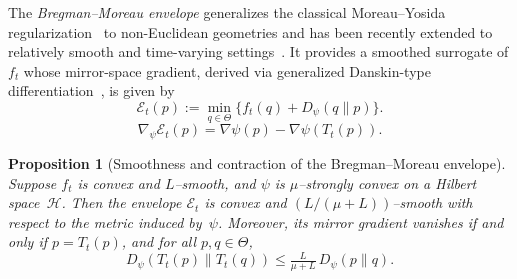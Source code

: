 \documentclass[11pt]{article}
\newcommand{\Ecal}{\mathcal{E}}
\theoremstyle{plain}
\newtheorem{proposition}[theorem]{Proposition}
\theoremstyle{definition}
\theoremstyle{remark}
\begin{document}

The \emph{Bregman--Moreau envelope} generalizes the classical
Moreau--Yosida regularization~\cite{Rockafellar1970}
to non-Euclidean geometries and has been recently extended to
relatively smooth and time-varying settings~\cite{Lu2021,Li2022,Hsieh2023}.
It provides a smoothed surrogate of $f_t$ whose mirror-space gradient,
derived via generalized Danskin-type differentiation~\cite{Zhang2020,Bauschke2019},
is given by
\begin{equation}
\Ecal_t(p):=\min_{q\in\Theta}\{f_t(q)+D_\psi(q\|p)\}.
\label{eq:moreau}
\end{equation}
\begin{equation}
\nabla_\psi \Ecal_t(p)=\nabla\psi(p)-\nabla\psi(T_t(p)).
\label{eq:env-gradient}
\end{equation}


\begin{proposition}[Smoothness and contraction of the Bregman--Moreau envelope]
\label{prop:moreau-smooth}
Suppose $f_t$ is convex and $L$--smooth, and $\psi$ is $\mu$--strongly convex on a Hilbert space~$\mathcal H$.  
Then the envelope $\Ecal_t$ is convex and $(L/(\mu+L))$--smooth with respect to the metric induced by~$\psi$.  
Moreover, its mirror gradient vanishes if and only if $p=T_t(p)$, and for all $p,q\in\Theta$,
\begin{equation}
D_\psi(T_t(p)\|T_t(q))
\le \tfrac{L}{\mu+L}\,D_\psi(p\|q).
\label{eq:envelope-contraction}
\end{equation}
\end{proposition}
\end{document}

